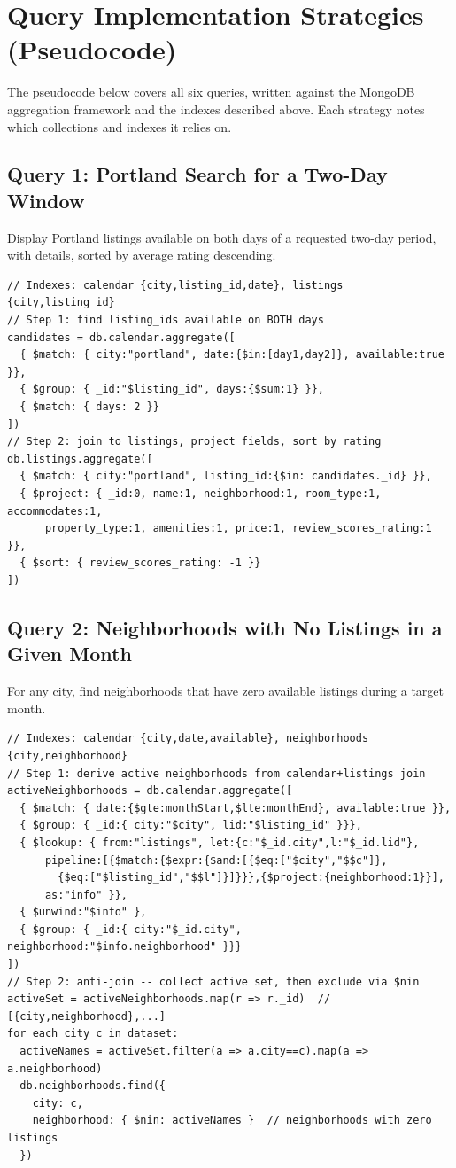 \documentclass[10pt]{article}
\begin{document}
\section{Query Implementation Strategies (Pseudocode)}

The pseudocode below covers all six queries, written against the MongoDB aggregation framework and the indexes described above. Each strategy notes which collections and indexes it relies on.

\subsection{Query 1: Portland Search for a Two-Day Window}

Display Portland listings available on both days of a requested two-day period, with details, sorted by average rating descending.

\begin{lstlisting}
// Indexes: calendar {city,listing_id,date}, listings {city,listing_id}
// Step 1: find listing_ids available on BOTH days
candidates = db.calendar.aggregate([
  { $match: { city:"portland", date:{$in:[day1,day2]}, available:true }},
  { $group: { _id:"$listing_id", days:{$sum:1} }},
  { $match: { days: 2 }}
])
// Step 2: join to listings, project fields, sort by rating
db.listings.aggregate([
  { $match: { city:"portland", listing_id:{$in: candidates._id} }},
  { $project: { _id:0, name:1, neighborhood:1, room_type:1, accommodates:1,
      property_type:1, amenities:1, price:1, review_scores_rating:1 }},
  { $sort: { review_scores_rating: -1 }}
])
\end{lstlisting}

\subsection{Query 2: Neighborhoods with No Listings in a Given Month}

For any city, find neighborhoods that have zero available listings during a target month.

\begin{lstlisting}
// Indexes: calendar {city,date,available}, neighborhoods {city,neighborhood}
// Step 1: derive active neighborhoods from calendar+listings join
activeNeighborhoods = db.calendar.aggregate([
  { $match: { date:{$gte:monthStart,$lte:monthEnd}, available:true }},
  { $group: { _id:{ city:"$city", lid:"$listing_id" }}},
  { $lookup: { from:"listings", let:{c:"$_id.city",l:"$_id.lid"},
      pipeline:[{$match:{$expr:{$and:[{$eq:["$city","$$c"]},
        {$eq:["$listing_id","$$l"]}]}}},{$project:{neighborhood:1}}],
      as:"info" }},
  { $unwind:"$info" },
  { $group: { _id:{ city:"$_id.city", neighborhood:"$info.neighborhood" }}}
])
// Step 2: anti-join -- collect active set, then exclude via $nin
activeSet = activeNeighborhoods.map(r => r._id)  // [{city,neighborhood},...]
for each city c in dataset:
  activeNames = activeSet.filter(a => a.city==c).map(a => a.neighborhood)
  db.neighborhoods.find({
    city: c,
    neighborhood: { $nin: activeNames }  // neighborhoods with zero listings
  })
\end{lstlisting}
\end{document}
